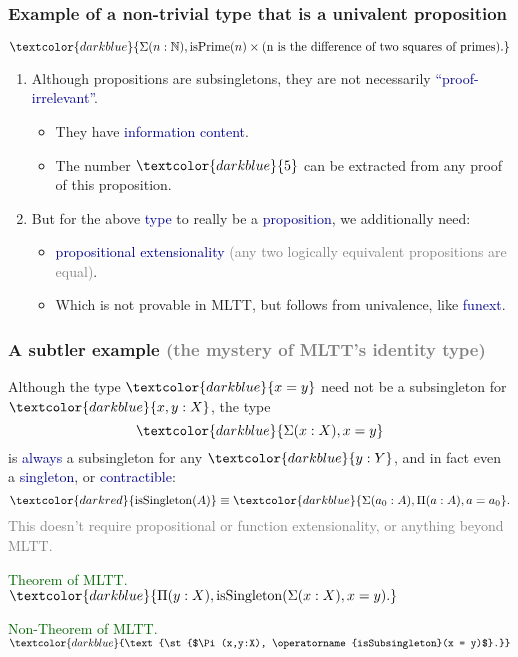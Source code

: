 \documentclass[aspectratio=169]{beamer}
\newcommand{\isPrime}{\operatorname{isPrime}}
\newcommand{\isSubsingleton}{\operatorname{isSubsingleton}}
\newcommand{\isSingleton}{\operatorname{isSingleton}}
\newcommand{\eqq}{\equiv}
\newcommand{\db}{\textcolor{darkblue}}
\newcommand{\dg}{\textcolor{darkgreen}}
\newcommand{\grey}{\textcolor{grey}}
\newcommand{\dr}{\textcolor{darkred}}
\newcommand{\m}[1]{$\db{#1}$}
\newcommand{\M}[1]{\[\db{#1}\]}
\newcommand{\N}{\mathbb{N}}
\begin{document}
\begin{frame}
  \frametitle{Example of a non-trivial type that is a univalent proposition}

\M{\Sigma(n:\N), \isPrime(n) \times \text{(n is the difference of two squares of primes).}}

\begin{enumerate}
\vfill \item Although propositions are subsingletons, they are not necessarily \db{``proof-irrelevant''}.
\begin{itemize}
\vfill \item They have \db{information content}. 
\vfill \item The number \m{5} can be extracted from any proof of this proposition.
\end{itemize}

\vfill \item But for the above \db{type} to really be a \db{proposition}, we additionally need:
  \begin{itemize}
\vfill \item \db{propositional extensionality} \grey{(any two logically equivalent  
propositions are equal)}.
\vfill \item Which is not provable in MLTT, but follows from univalence, like \db{funext}.
\end{itemize}

\end{enumerate}

\vfill
\end{frame}

\begin{frame}
  \frametitle{A subtler example \grey{(the mystery of MLTT's identity type)}}

Although the type \m{x=y} need not be a subsingleton for \m{x,y:X}, the type
\M{\Sigma(x:X), x = y}
is \db{always} a subsingleton for any \m{y:Y}, and in fact even a \db{singleton}, or \db{contractible}:
\[
\dr{\isSingleton(A)} \eqq \db{\Sigma(a_0:A), \Pi(a:A), a = a_0}. 
\]
\grey{This doesn't require propositional or function extensionality, or anything beyond MLTT.}

\vfill

\dg{Theorem of MLTT.} \m{\Pi(y:X), \isSingleton(\Sigma(x:X), x = y).}

\vfill

\dg{Non-Theorem of MLTT.} \m{\text{\st{$\Pi(x,y:X), \isSubsingleton(x = y)$}.}}

\end{frame}
\end{document}
